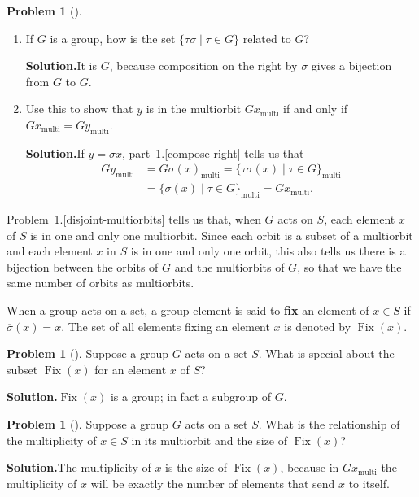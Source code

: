 \documentclass[10pt,]{book}
\newcommand{\terminology}[1]{\textbf{#1}}
\theoremstyle{plain}
\theoremstyle{definition}
\newtheorem{activity}[project]{Problem}
\theoremstyle{definition}
\numberwithin{equation}{chapter}
\DeclareMathOperator{\Fix}{Fix}
\begin{document}
\begin{activity}[]\label{activity-292}
\leavevmode%
\begin{enumerate}[font=\bfseries,label=(\alph*),ref=\alph*]
\item\label{compose-right} If \(G\) is a group, how is the set \(\{\tau\sigma\mid\tau\in G\}\) related to \(G\)?%
\par\medskip\noindent%
\textbf{Solution.}\quad It is \(G\), because composition on the right by \(\sigma\) gives a bijection from \(G\) to \(G\).%
\item\label{disjoint-multiorbits} Use this to show that \(y\) is in the multiorbit \(Gx_{\text{multi}}\) if and only if \(Gx_{\text{multi}} = Gy_{\text{multi}}\).%
\par\medskip\noindent%
\textbf{Solution.}\quad If \(y=\sigma x\), \hyperref[compose-right]{part~\ref{activity-292}.\ref{compose-right}} tells us that%
\begin{align*}
Gy_{\text{multi}} &= G\sigma(x)_{\text{multi}} = \{\tau\sigma(x)\mid \tau\in G\}_{\text{multi}}\\
&= \{\sigma(x) \mid \tau\in G\}_{\text{multi}} = Gx_{\text{multi}}\text{.}
\end{align*}
%
\end{enumerate}
\end{activity}
\hyperref[disjoint-multiorbits]{Problem~\ref{activity-292}.\ref{disjoint-multiorbits}} tells us that, when \(G\) acts on \(S\), each element \(x\) of \(S\) is in one and only one multiorbit. Since each orbit is a subset of a multiorbit and each element \(x\) in \(S\) is in one and only one orbit, this also tells us there is a bijection between the orbits of \(G\) and the multiorbits of \(G\), so that we have the same number of orbits as multiorbits.%
\par
When a group acts on a set, a group element is said to \terminology{fix} an element of \(x \in S\) if \(\overline{\sigma}(x) = x\). The set of all elements fixing an element \(x\) is denoted by \(\Fix(x)\).%
\begin{activity}[]\label{activity-293}
Suppose a group \(G\) acts on a set \(S\). What is special about the subset \(\Fix(x)\) for an element \(x\) of \(S\)?%
\par\medskip\noindent%
\textbf{Solution.}\quad \(\Fix(x)\) is a group; in fact a subgroup of \(G\).%
\end{activity}
\begin{activity}[]\label{activity-294}
Suppose a group \(G\) acts on a set \(S\). What is the relationship of the multiplicity of \(x\in S\) in its multiorbit and the size of \(\Fix(x)\)?%
\par\medskip\noindent%
\textbf{Solution.}\quad The multiplicity of \(x\) is the size of \(\Fix(x)\), because in \(Gx_{\text{multi}}\) the multiplicity of \(x\) will be exactly the number of elements that send \(x\) to itself.%
\end{activity}
\end{document}
